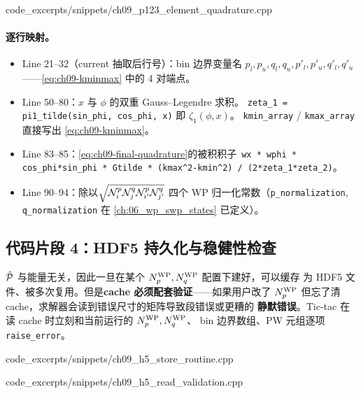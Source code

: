 
{code_excerpts/snippets/ch09_p123_element_quadrature.cpp}

\paragraph{逐行映射。}
\begin{itemize}
\item Line 21--32（current 抽取后行号）：bin 边界变量名 \(p_l, p_u, q_l, q_u, p'_l, p'_u, q'_l, q'_u\)
      ——\eqref{eq:ch09-kminmax} 中的 4 对端点。
\item Line 50--80：\(x\) 与 \(\phi\) 的双重 Gauss--Legendre 求积。
      \texttt{zeta\_1 = pi1\_tilde(sin\_phi, cos\_phi, x)} 即 \(\zeta_1(\phi,x)\)。
      \texttt{kmin\_array} / \texttt{kmax\_array} 直接写出 \eqref{eq:ch09-kminmax}。
\item Line 83--85：\eqref{eq:ch09-final-quadrature}的被积积子\
      \verb|wx * wphi * cos_phi*sin_phi * Gtilde * (kmax^2-kmin^2) / (2*zeta_1*zeta_2)|。
\item Line 90--94：除以\(\sqrt{\mathcal{N}^p_i\mathcal{N}^q_j\mathcal{N}^p_{i'}\mathcal{N}^q_{j'}}\)
      四个 WP 归一化常数（\texttt{p\_normalization}, \texttt{q\_normalization}
      在 \cref{ch:06_wp_swp_states} 已定义）。
\end{itemize}

\subsection{代码片段 4：HDF5 持久化与稳健性检查}
\label{subsec:ch09-code-h5cache}

\(\hat{\mathcal{P}}\) 与能量无关，因此一旦在某个 \({N_{p}^{\text{WP}}}, {N_{q}^{\text{WP}}}\) 配置下建好，可以缓存
为 HDF5 文件、被多次复用。但是\textbf{cache 必须配套验证}——如果用户改了
\({N_{p}^{\text{WP}}}\) 但忘了清 cache，求解器会读到错误尺寸的矩阵导致段错误或更糟的
\textbf{静默错误}。Tic-tac 在读 cache 时立刻和当前运行的 \({N_{p}^{\text{WP}}}, {N_{q}^{\text{WP}}}\)、
bin 边界数组、PW 元组逐项 \texttt{raise\_error}。


{code_excerpts/snippets/ch09_h5_store_routine.cpp}


{code_excerpts/snippets/ch09_h5_read_validation.cpp}


